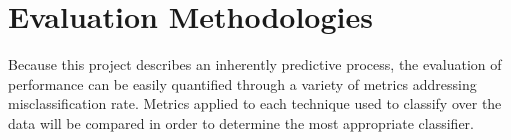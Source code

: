 \documentclass[letterpaper,10pt]{article}
\begin{document}
\section{Evaluation Methodologies}

Because this project describes an inherently predictive process, the
evaluation of performance can be easily quantified through a variety of
metrics addressing misclassification rate. Metrics applied to each
technique used to classify over the data will be compared in order to
determine the most appropriate classifier.

\nocite{*}



\end{document}
